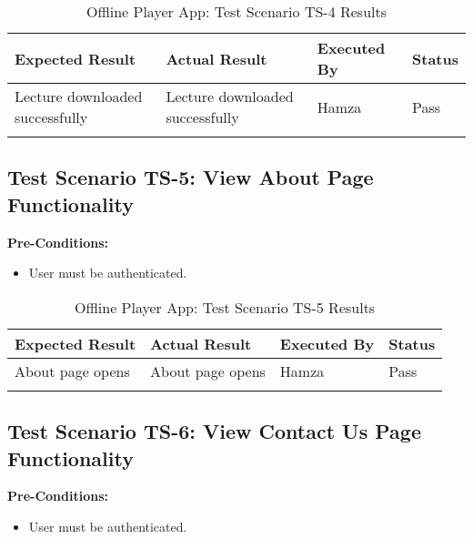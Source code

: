 \bigskip

\begin{longtable}{|p{4cm}|p{4cm}|p{2cm}|p{2cm}|}
\hline
\textbf{Expected Result} & \textbf{Actual Result} & \textbf{Executed By} & \textbf{Status}\\
\hline
Lecture downloaded successfully &
Lecture downloaded successfully &
Hamza &
Pass \\
\hline

\caption{Offline Player App: Test Scenario TS-4 Results}
\end{longtable}

\subsection{Test Scenario TS-5: View About Page Functionality}

\textbf{Pre-Conditions: }
\begin{itemize}

\item User must be authenticated.

\end{itemize}




\bigskip

\begin{longtable}{|p{4cm}|p{4cm}|p{2cm}|p{2cm}|}
\hline
\textbf{Expected Result} & \textbf{Actual Result} & \textbf{Executed By} & \textbf{Status}\\
\hline
About page opens &
About page opens &
Hamza &
Pass \\
\hline

\caption{Offline Player App: Test Scenario TS-5 Results}
\end{longtable}

\subsection{Test Scenario TS-6: View Contact Us Page Functionality}

\textbf{Pre-Conditions: }
\begin{itemize}

\item User must be authenticated.

\end{itemize}



\bigskip

